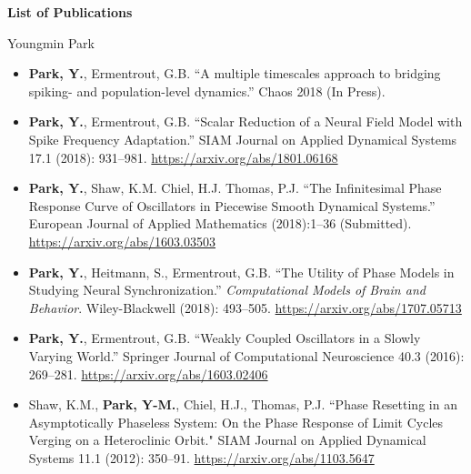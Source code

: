 \documentclass[a4paper,11pt]{article}
\begin{document}
\begin{center}
\Large \textbf{List of Publications}

\Large Youngmin Park
\end{center}

\begin{itemize}
 \item \textbf{Park, Y.}, Ermentrout, G.B. ``A multiple timescales approach to bridging spiking- and population-level dynamics.'' Chaos 2018 (In Press). 
 \item \textbf{Park, Y.}, Ermentrout, G.B. ``Scalar Reduction of a Neural Field Model with Spike Frequency Adaptation.'' SIAM Journal on Applied Dynamical Systems 17.1 (2018): 931--981. \url{https://arxiv.org/abs/1801.06168}
 \item \textbf{Park, Y.}, Shaw, K.M. Chiel, H.J. Thomas, P.J. ``The Infinitesimal Phase Response Curve of Oscillators in Piecewise Smooth Dynamical Systems.'' European Journal of Applied Mathematics (2018):1--36 (Submitted). \url{https://arxiv.org/abs/1603.03503}
 \item \textbf{Park, Y.}, Heitmann, S., Ermentrout, G.B. ``The Utility of Phase Models in Studying Neural Synchronization.'' \textit{Computational Models of Brain and Behavior}. Wiley-Blackwell (2018): 493--505. \url{https://arxiv.org/abs/1707.05713}
 \item \textbf{Park, Y.}, Ermentrout, G.B. ``Weakly Coupled Oscillators in a Slowly Varying World.'' Springer Journal of Computational Neuroscience 40.3 (2016): 269--281. \url{https://arxiv.org/abs/1603.02406}
 \item Shaw, K.M., \textbf{Park, Y-M.}, Chiel, H.J., Thomas, P.J. ``Phase Resetting in an Asymptotically Phaseless System: On the Phase Response of Limit Cycles Verging on a Heteroclinic Orbit." SIAM Journal on Applied Dynamical Systems 11.1 (2012): 350--91. \url{https://arxiv.org/abs/1103.5647}
\end{itemize}
\end{document}
